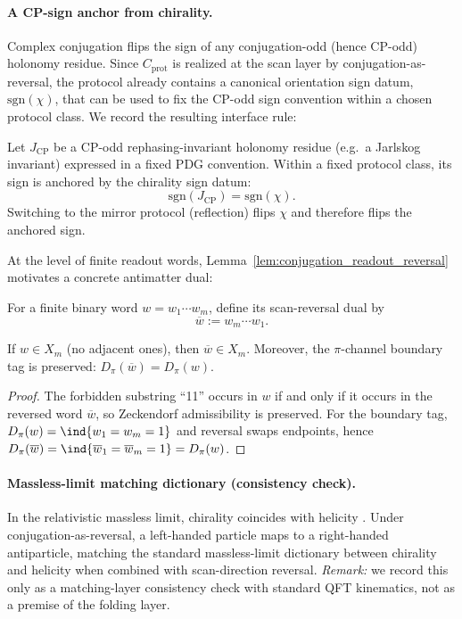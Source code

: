 \paragraph{A CP-sign anchor from chirality.}
Complex conjugation flips the sign of any conjugation-odd (hence CP-odd) holonomy residue.
Since $C_{\mathrm{prot}}$ is realized at the scan layer by conjugation-as-reversal, the protocol already contains a canonical orientation sign datum, $\mathrm{sgn}(\chi)$, that can be used to fix the CP-odd sign convention within a chosen protocol class.
We record the resulting interface rule:
\begin{definition}\label{ax:chi_cp_sign}
Let $J_{\mathrm{CP}}$ be a CP-odd rephasing-invariant holonomy residue (e.g.\ a Jarlskog invariant) expressed in a fixed PDG convention.
Within a fixed protocol class, its sign is anchored by the chirality sign datum:
\[
\mathrm{sgn}(J_{\mathrm{CP}})=\mathrm{sgn}(\chi).
\]
Switching to the mirror protocol (reflection) flips $\chi$ and therefore flips the anchored sign.
\end{definition}
At the level of finite readout words, Lemma~\ref{lem:conjugation_readout_reversal} motivates a concrete antimatter dual:
\begin{definition}\label{def:word_reversal_dual}
For a finite binary word $w=w_1\cdots w_m$, define its scan-reversal dual by
\[
\overline{w}:=w_m\cdots w_1.
\]
\end{definition}
\begin{lemma}\label{lem:reverse_preserves_admissibility}
If $w\in X_m$ (no adjacent ones), then $\overline{w}\in X_m$.
Moreover, the $\pi$-channel boundary tag is preserved: $D_\pi(\overline{w})=D_\pi(w)$.
\end{lemma}
\begin{proof}
The forbidden substring ``11'' occurs in $w$ if and only if it occurs in the reversed word $\overline{w}$, so Zeckendorf admissibility is preserved.
For the boundary tag, $D_\pi(w)=\ind\{w_1=w_m=1\}$ and reversal swaps endpoints, hence $D_\pi(\overline{w})=\ind\{\overline{w}_1=\overline{w}_m=1\}=D_\pi(w)$.
\end{proof}

\paragraph{Massless-limit matching dictionary (consistency check).}
In the relativistic massless limit, chirality coincides with helicity \cite{PeskinSchroeder1995,WeinbergQFT1995}.
Under conjugation-as-reversal, a left-handed particle maps to a right-handed antiparticle, matching the standard massless-limit dictionary between chirality and helicity when combined with scan-direction reversal.
\emph{Remark:} we record this only as a matching-layer consistency check with standard QFT kinematics, not as a premise of the folding layer.

